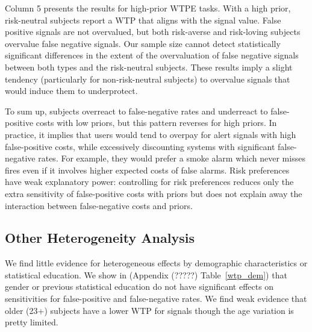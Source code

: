 \documentclass[12pt,a4paper]{article}
\newcommand{\agt}[1]{{\color{OliveGreen}#1}}
\newcommand{\aut}[1]{{\color{Red}#1}}
\begin{document}
Column 5 presents the results for high-prior WTPE tasks. With a high prior, risk-neutral subjects report a WTP that aligns with the signal value. False positive signals are not overvalued, but both risk-averse and risk-loving subjects overvalue false negative signals. Our sample size cannot detect statistically significant differences in the extent of the overvaluation of false negative signals between both types and the risk-neutral subjects. These results imply a slight tendency (particularly for non-risk-neutral subjects) to overvalue signals that would induce them to underprotect.

To sum up, subjects overreact to false-negative rates and underreact to false-positive costs with low priors, but this pattern reverses for high priors. In practice, it implies that users would tend to overpay for alert signals with high false-positive costs, while excessively discounting systems with significant false-negative rates. For example, they would prefer a smoke alarm which never misses fires even if it involves higher expected costs of false alarms. Risk preferences have weak explanatory power: controlling for risk preferences reduces only the extra sensitivity of false-positive costs with priors but does not explain away the interaction between false-negative costs and priors. 





\subsection{Other Heterogeneity Analysis}

We find little evidence for heterogeneous effects by demographic characteristics or statistical education. We show in (Appendix (\agt{?????}) Table~\ref{wtp_dem}) that gender or previous statistical education do not have significant effects on sensitivities for false-positive and false-negative rates. We find weak evidence that older (23+) subjects have a lower WTP for signals though the age variation is pretty limited. 
\end{document}
